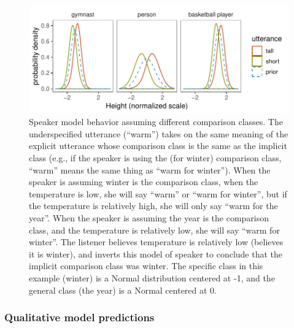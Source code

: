 \documentclass[doc]{apa6}
\begin{document}
\begin{figure}
\centering
\includegraphics{figs/adjectives_2ccs_tall_mucost3_s10_wSubCatPrior_widerXdomain.pdf}
\caption{\label{fig:speakerSimulations}Speaker model behavior assuming
different comparison classes. The underspecified utterance
(``warm'') takes on the same meaning of the explicit utterance
whose comparison class is the same as the implicit class (e.g., if the
speaker is using the (for winter) comparison class, ``warm'' means
the same thing as ``warm for winter''). When the speaker is
assuming winter is the comparison class, when the temperature is low, she
will say ``warm'' or ``warm for winter'', but if the
temperature is relatively high, she will only say ``warm for the
year''. When the speaker is assuming the year is the comparison class,
and the temperature is relatively low, she will say ``warm for
winter''. The listener believes temperature is relatively low (believes
it is winter), and inverts this model of speaker to conclude that the
implicit comparison class was winter. The specific class in this example
(winter) is a Normal distribution centered at -1, and the general class
(the year) is a Normal centered at 0.}
\end{figure}

\subsubsection{Qualitative model
predictions}
\end{document}
